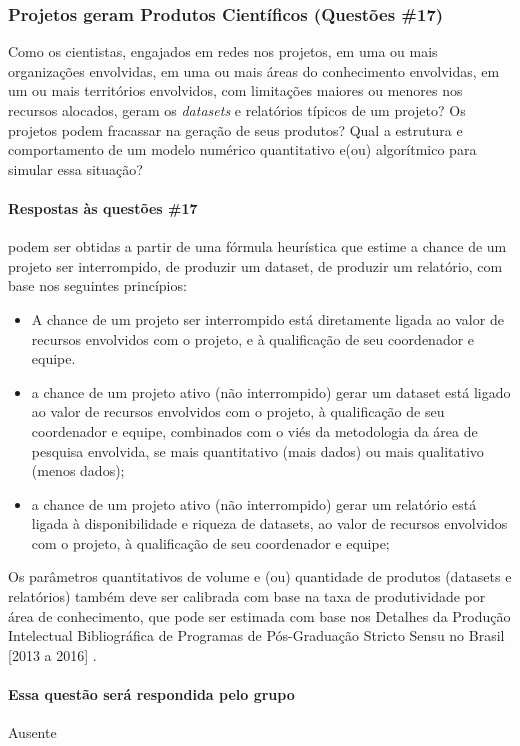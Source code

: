 \subsubsection{Projetos geram Produtos Científicos (Questões \#17)} Como os cientistas, engajados em redes nos projetos, em uma ou mais organizações envolvidas, em uma ou mais áreas do conhecimento envolvidas, em um ou mais territórios envolvidos, com limitações maiores ou menores nos recursos alocados, geram os \textit{datasets} e relatórios típicos de um projeto? Os projetos podem fracassar na geração de seus produtos? Qual a estrutura e comportamento de um modelo numérico quantitativo e(ou) algorítmico para simular essa situação? 

\paragraph{Respostas às questões \#17} 
podem ser obtidas a partir de uma fórmula heurística que estime a chance de um projeto ser interrompido, de produzir um dataset, de produzir um relatório, com base nos seguintes princípios:
\begin{itemize}
    \item A chance de um projeto ser interrompido está diretamente ligada ao valor de recursos envolvidos com o projeto, e à qualificação de seu coordenador e equipe.
    \item a chance de um projeto ativo (não interrompido) gerar um dataset está ligado ao valor de recursos envolvidos com o projeto, à qualificação de seu coordenador e equipe, combinados com o viés da metodologia da área de pesquisa envolvida, se mais quantitativo (mais dados) ou mais qualitativo (menos dados);
    \item a chance de um projeto ativo (não interrompido) gerar um relatório está ligada à disponibilidade e riqueza de datasets, ao valor de recursos envolvidos com o projeto, à qualificação de seu coordenador e equipe;
\end{itemize}

Os parâmetros quantitativos de volume e (ou) quantidade de produtos (datasets e relatórios) também deve ser calibrada com base na taxa de produtividade por área de conhecimento, que pode ser estimada com base nos Detalhes da Produção Intelectual Bibliográfica de Programas de Pós-Graduação Stricto Sensu no Brasil [2013 a 2016] \cite{capes_detalhes_2017}.

\paragraph{Essa questão será respondida pelo grupo}
Ausente

